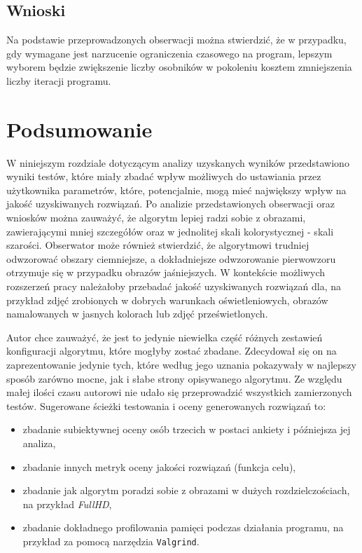 \subsection{Wnioski}
Na podstawie przeprowadzonych obserwacji można stwierdzić, że w przypadku, gdy wymagane jest narzucenie ograniczenia czasowego na program, lepszym wyborem będzie zwiększenie liczby osobników w pokoleniu kosztem zmniejszenia liczby iteracji programu. 

\section{Podsumowanie}
W niniejszym rozdziale dotyczącym analizy uzyskanych wyników przedstawiono wyniki testów, które miały zbadać wpływ możliwych do ustawiania przez użytkownika parametrów, które, potencjalnie, mogą mieć największy wpływ na jakość uzyskiwanych rozwiązań. Po analizie przedstawionych obserwacji oraz wniosków można zauważyć, że algorytm lepiej radzi sobie z obrazami, zawierającymi mniej szczegółów oraz w jednolitej skali kolorystycznej - skali szarości. Obserwator może również stwierdzić, że algorytmowi trudniej odwzorować obszary ciemniejsze, a dokładniejsze odwzorowanie pierwowzoru otrzymuje się w przypadku obrazów jaśniejszych. W kontekście możliwych rozszerzeń pracy należałoby przebadać jakość uzyskiwanych rozwiązań dla, na przykład zdjęć zrobionych w dobrych warunkach oświetleniowych, obrazów namalowanych w jasnych kolorach lub zdjęć prześwietlonych.

Autor chce zauważyć, że jest to jedynie niewielka część różnych zestawień konfiguracji algorytmu, które mogłyby zostać zbadane. Zdecydował się on na zaprezentowanie jedynie tych, które według jego uznania pokazywały w najlepszy sposób zarówno mocne, jak i słabe strony opisywanego algorytmu. Ze względu małej ilości czasu autorowi nie udało się przeprowadzić wszystkich zamierzonych testów. Sugerowane ścieżki testowania i oceny generowanych rozwiązań to:
\begin{itemize}
    \item zbadanie subiektywnej oceny osób trzecich w postaci ankiety i późniejsza jej analiza,
    \item zbadanie innych metryk oceny jakości rozwiązań (funkcja celu),
    \item zbadanie jak algorytm poradzi sobie z obrazami w dużych rozdzielczościach, na przykład \textit{FullHD},
    \item zbadanie dokładnego profilowania pamięci podczas działania programu, na przykład za pomocą narzędzia \texttt{Valgrind}.
\end{itemize}
